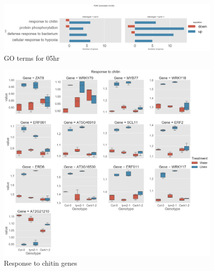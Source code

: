\documentclass[../main.tex]{subfiles}
\begin{document}

   
   \begin{figure}[ht]
     \centering
     \includegraphics[width=\columnwidth]{figures/05hrGO.png}
     \caption{\label{fig:05hrGO} GO terms for 05hr}
   \end{figure}



   \begin{figure}[ht]
     \centering
     \includegraphics[width=\textwidth, height=\textheight, keepaspectratio]{figures/response to chitin.png}
     \caption{\label{fig:respchitin} Response to chitin genes}
   \end{figure}


   
\end{document}
